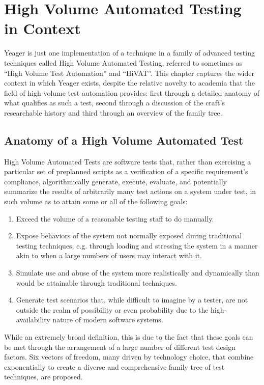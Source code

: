 \chapter{High Volume Automated Testing in Context}
Yeager is just one implementation of a technique in a family of advanced testing techniques called High Volume Automated Testing, referred to sometimes as ``High Volume Test Automation'' and ``HiVAT''. This chapter captures the wider context in which Yeager exists, despite the relative novelty to academia that the field of high volume test automation provides: first through a detailed anatomy of what qualifies as such a test, second through a discussion of the craft's researchable history and third through an overview of the family tree.

\section{Anatomy of a High Volume Automated Test}
High Volume Automated Tests are software tests that, rather than exercising a particular set of preplanned scripts as a verification of a specific requirement's compliance, algorithmically generate, execute, evaluate, and potentially summarize the results of arbitrarily many test actions on a system under test, in such volume as to attain some or all of the following goals:
\begin{enumerate}
\item Exceed the volume of a reasonable testing staff to do manually.
\item Expose behaviors of the system not normally exposed during traditional testing techniques, e.g. through loading and stressing the system in a manner akin to when a large numbers of users may interact with it.
\item Simulate use and abuse of the system more realistically and dynamically than would be attainable through traditional techniques.
\item Generate test scenarios that, while difficult to imagine by a tester, are not outside the realm of possibility or even probability due to the high-availability nature of modern software systems.
\end{enumerate}

While an extremely broad definition, this is due to the fact that these goals can be met through the arrangement of a large number of different test design factors. Six vectors of freedom, many driven by technology choice, that combine exponentially to create a diverse and comprehensive family tree of test techniques, are proposed.

